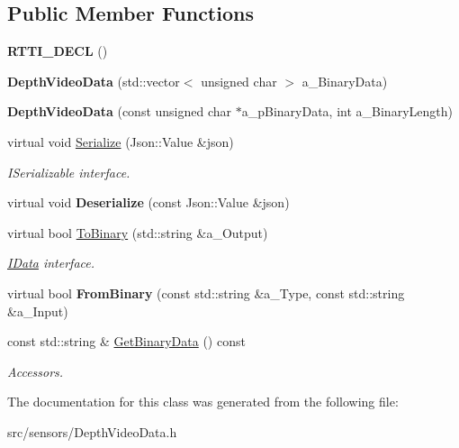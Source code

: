 \subsection*{Public Member Functions}
\begin{DoxyCompactItemize}
\item 
\mbox{\label{class_depth_video_data_a6b3312129563abc81bba2a690b11d12e}} 
{\bfseries R\+T\+T\+I\+\_\+\+D\+E\+CL} ()
\item 
\mbox{\label{class_depth_video_data_a72644ddffe7de073e34a248c3cbec3ce}} 
{\bfseries Depth\+Video\+Data} (std\+::vector$<$ unsigned char $>$ a\+\_\+\+Binary\+Data)
\item 
\mbox{\label{class_depth_video_data_a41fd5698a463d0a6efa0039ebbfb05f4}} 
{\bfseries Depth\+Video\+Data} (const unsigned char $\ast$a\+\_\+p\+Binary\+Data, int a\+\_\+\+Binary\+Length)
\item 
\mbox{\label{class_depth_video_data_affa3c056b75c1920183babd1bf9bb63c}} 
virtual void \hyperlink{class_depth_video_data_affa3c056b75c1920183babd1bf9bb63c}{Serialize} (Json\+::\+Value \&json)
\begin{DoxyCompactList}\small\item\em I\+Serializable interface. \end{DoxyCompactList}\item 
\mbox{\label{class_depth_video_data_aacfe6c0c25219273735f0951d299f5d2}} 
virtual void {\bfseries Deserialize} (const Json\+::\+Value \&json)
\item 
\mbox{\label{class_depth_video_data_a0902f7a270581cd84d79866f0273680e}} 
virtual bool \hyperlink{class_depth_video_data_a0902f7a270581cd84d79866f0273680e}{To\+Binary} (std\+::string \&a\+\_\+\+Output)
\begin{DoxyCompactList}\small\item\em \hyperlink{class_i_data}{I\+Data} interface. \end{DoxyCompactList}\item 
\mbox{\label{class_depth_video_data_ab0f785e8e3a260363e360c1f32297268}} 
virtual bool {\bfseries From\+Binary} (const std\+::string \&a\+\_\+\+Type, const std\+::string \&a\+\_\+\+Input)
\item 
\mbox{\label{class_depth_video_data_aa484924fea12da3b835754ea7f21c09a}} 
const std\+::string \& \hyperlink{class_depth_video_data_aa484924fea12da3b835754ea7f21c09a}{Get\+Binary\+Data} () const
\begin{DoxyCompactList}\small\item\em Accessors. \end{DoxyCompactList}\end{DoxyCompactItemize}


The documentation for this class was generated from the following file\+:\begin{DoxyCompactItemize}
\item 
src/sensors/Depth\+Video\+Data.\+h\end{DoxyCompactItemize}
